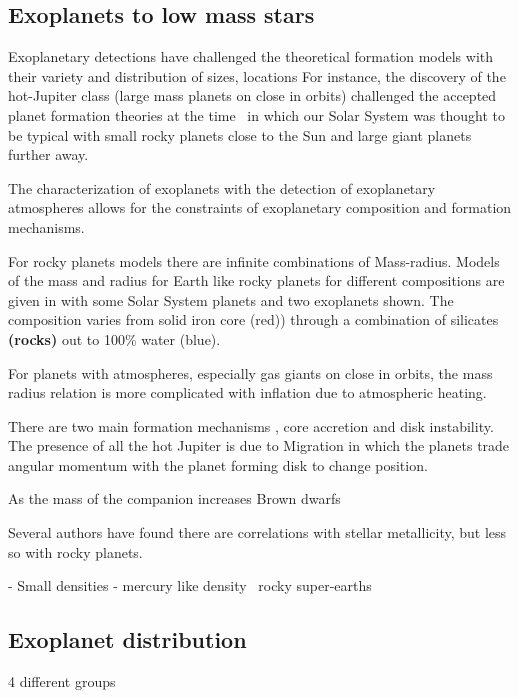 
\subsection{Exoplanets to low mass stars}

Exoplanetary detections have challenged the theoretical formation models with their variety and distribution of sizes, locations For instance, the discovery of the hot-Jupiter class (large mass planets on close in orbits) challenged the accepted planet formation theories at the time~\citep[.e.g][]{pollack_formation_1996} in which our Solar System was thought to be typical with small rocky planets close to the Sun and large giant planets further away.

The characterization of exoplanets with the detection of exoplanetary atmospheres allows for the constraints of exoplanetary composition and formation mechanisms.

For rocky planets models there are infinite combinations of Mass-radius. Models of the mass and radius for Earth like rocky planets for different compositions are given in  with some Solar System planets and two exoplanets shown. The composition varies from solid iron core (red)) through a combination of silicates \textbf{(rocks)} out to 100\% water (blue).


For planets with atmospheres, especially gas giants on close in orbits, the mass radius relation is more complicated with inflation due to atmospheric heating. 



There are two main formation mechanisms , core accretion and disk instability. The presence of all the hot Jupiter is due to Migration in which the planets trade angular momentum with the planet forming disk to change position.

As the mass of the companion increases 
Brown dwarfs

Several authors have found there are correlations with stellar metallicity, but less so with rocky planets.


- Small densities - mercury like  density~\citet{dittmann_temperate_2017, santerne_earthsized_2018, ment_second_2018} rocky super-earths\\


\subsection{Exoplanet distribution} 4 different groups


